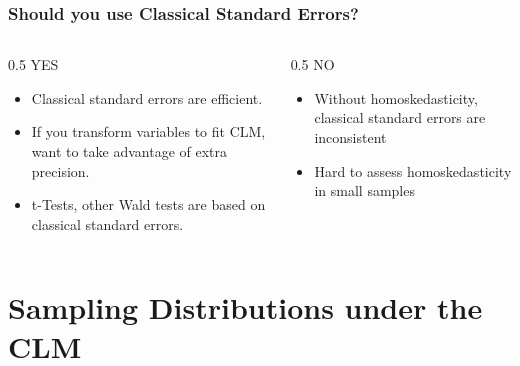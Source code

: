\documentclass[12pt, block=fill]{beamer}
\begin{document}
\begin{frame}
  \frametitle{Should you use Classical Standard Errors?}
  
  \begin{columns}[t]
\begin{column}{0.5\textwidth}
YES
\begin{itemize}
\item Classical standard errors are efficient.
\item If you transform variables to fit CLM, want to take advantage of extra precision.
\item t-Tests, other Wald tests are based on classical standard errors.
\end{itemize}

\end{column}
\begin{column}{0.5\textwidth}
NO
\begin{itemize}
\item Without homoskedasticity, classical standard errors are inconsistent
\item Hard to assess homoskedasticity in small samples
\end{itemize}


\end{column}
\end{columns}
\end{frame}



\section{Sampling Distributions under the CLM}
\end{document}

